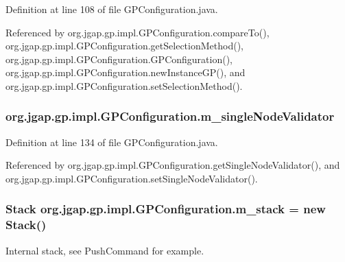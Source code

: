 Definition at line 108 of file G\-P\-Configuration.\-java.



Referenced by org.\-jgap.\-gp.\-impl.\-G\-P\-Configuration.\-compare\-To(), org.\-jgap.\-gp.\-impl.\-G\-P\-Configuration.\-get\-Selection\-Method(), org.\-jgap.\-gp.\-impl.\-G\-P\-Configuration.\-G\-P\-Configuration(), org.\-jgap.\-gp.\-impl.\-G\-P\-Configuration.\-new\-Instance\-G\-P(), and org.\-jgap.\-gp.\-impl.\-G\-P\-Configuration.\-set\-Selection\-Method().

\hypertarget{classorg_1_1jgap_1_1gp_1_1impl_1_1_g_p_configuration_a6be223823385d4e27a9b4a511ba4a9a9}{
\subsubsection[{m\-\_\-single\-Node\-Validator}]{ org.\-jgap.\-gp.\-impl.\-G\-P\-Configuration.\-m\-\_\-single\-Node\-Validator\hspace{0.3cm}{\ttfamily [private]}}}\label{classorg_1_1jgap_1_1gp_1_1impl_1_1_g_p_configuration_a6be223823385d4e27a9b4a511ba4a9a9}


Definition at line 134 of file G\-P\-Configuration.\-java.



Referenced by org.\-jgap.\-gp.\-impl.\-G\-P\-Configuration.\-get\-Single\-Node\-Validator(), and org.\-jgap.\-gp.\-impl.\-G\-P\-Configuration.\-set\-Single\-Node\-Validator().

\hypertarget{classorg_1_1jgap_1_1gp_1_1impl_1_1_g_p_configuration_afe6a1da01b8884546c356f0c6403a280}{
\subsubsection[{m\-\_\-stack}]{\setlength{\rightskip}{0pt plus 5cm}Stack org.\-jgap.\-gp.\-impl.\-G\-P\-Configuration.\-m\-\_\-stack = new Stack()\hspace{0.3cm}{\ttfamily [private]}}}\label{classorg_1_1jgap_1_1gp_1_1impl_1_1_g_p_configuration_afe6a1da01b8884546c356f0c6403a280}
Internal stack, see Push\-Command for example. 

